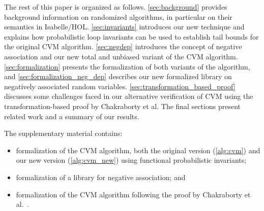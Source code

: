 The rest of this paper is organized as follows.
\cref{sec:background} provides background information on randomized algorithms, in particular on their semantics in Isabelle/HOL.
\cref{sec:invariants} introduces our new technique and explains how probabilistic loop invariants can be used to establish tail bounds for the original CVM algorithm.
\cref{sec:negdep} introduces the concept of negative association and our new total and unbiased variant of the CVM algorithm.
\cref{sec:formalization} presents the formalization of both variants of the algorithm, and \cref{sec:formalization_neg_dep} describes our new formalized library on negatively associated random variables.
\cref{sec:transformation_based_proof} discusses some challenges faced in our alternative verification of CVM using the transformation-based proof by Chakraborty et al.
The final sections present related work and a summary of our results.

The supplementary material contains:
\begin{itemize}
\item formalization of the CVM algorithm, both the original version (\cref{alg:cvm}) and our new version (\cref{alg:cvm_new}) using functional probabilistic invariants;
\item formalization of a library for negative association; and %
\item formalization of the CVM algorithm following the proof by Chakraborty et al.~\cite{chakraborty2022,chakraborty2023}.
\end{itemize}



